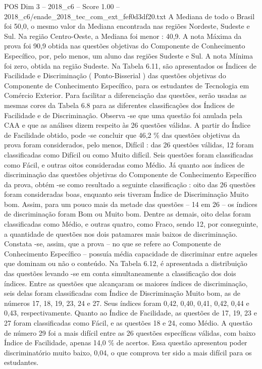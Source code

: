 \begin{textsample}{POS Dim 3 – 2018\_c6 – Score 1.00 – 2018\_c6/enade\_2018\_tec\_com\_ext\_fef0d3df20.txt}
A Mediana de todo o Brasil foi 50,0, o mesmo valor da Mediana encontrada nas regiões Nordeste, Sudeste e Sul.
Na região Centro-Oeste, a Mediana foi menor : 40,9.
A nota Máxima da prova foi 90,9 obtida nas questões objetivas do Componente de Conhecimento Específico, por, pelo menos, um aluno das regiões Sudeste e Sul.
A nota Mínima foi zero, obtida na região Sudeste.
Na Tabela 6.11, são apresentados os Índices de Facilidade e Discriminação ( Ponto-Bisserial ) das questões objetivas do Componente de Conhecimento Específico, para os estudantes de Tecnologia em Comércio Exterior.
Para facilitar a diferenciação das questões, serão usadas as mesmas cores da Tabela 6.8 para as diferentes classificações dos Índices de Facilidade e de Discriminação.
Observa -se que uma questão foi anulada pela CAA e que as análises dizem respeito às 26 questões válidas.
A partir do Índice de Facilidade obtido, pode -se concluir que 46,2 \% das questões objetivas da prova foram considerados, pelo menos, Difícil : das 26 questões válidas, 12 foram classificadas como Difícil ou como Muito difícil.
Seis questões foram classificadas como Fácil, e outras oitos consideradas como Médio.
Já quanto aos índices de discriminação das questões objetivas do Componente de Conhecimento Específico da prova, obtém -se como resultado a seguinte classificação : oito das 26 questões foram consideradas boas, enquanto seis tiveram Índice de Discriminação Muito bom.
Assim, para um pouco mais da metade das questões – 14 em 26 – os índices de discriminação foram Bom ou Muito bom.
Dentre as demais, oito delas foram classificadas como Médio, e outras quatro, como Fraco, sendo 12, por conseguinte, a quantidade de questões nos dois patamares mais baixos de discriminação.
Constata -se, assim, que a prova – no que se refere ao Componente de Conhecimento Específico – possuía média capacidade de discriminar entre aqueles que dominam ou não o conteúdo.
Na Tabela 6.12, é apresentada a distribuição das questões levando -se em conta simultaneamente a classificação dos dois índices.
Entre as questões que alcançaram os maiores índices de discriminação, seis delas foram classificadas com Índice de Discriminação Muito bom, as de números 17, 18, 19, 23, 24 e 27.
Seus índices foram 0,42, 0,40, 0,41, 0,42, 0,44 e 0,43, respectivamente.
Quanto ao Índice de Facilidade, as questões de 17, 19, 23 e 27 foram classificadas como Fácil, e as questões 18 e 24, como Médio.
A questão de número 29 foi a mais difícil entre as 26 questões específicas válidas, com baixo Índice de Facilidade, apenas 14,0 \% de acertos.
Essa questão apresentou poder discriminatório muito baixo, 0,04, o que comprova ter sido a mais difícil para os estudantes.

\end{textsample}
